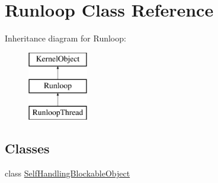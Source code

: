\hypertarget{class_runloop}{}\section{Runloop Class Reference}
\label{class_runloop}
Inheritance diagram for Runloop\+:\begin{figure}[H]
\begin{center}
\leavevmode
\includegraphics[height=3.000000cm]{class_runloop}
\end{center}
\end{figure}
\subsection*{Classes}
\begin{DoxyCompactItemize}
\item 
class \hyperlink{class_runloop_1_1_self_handling_blockable_object}{Self\+Handling\+Blockable\+Object}
\end{DoxyCompactItemize}
